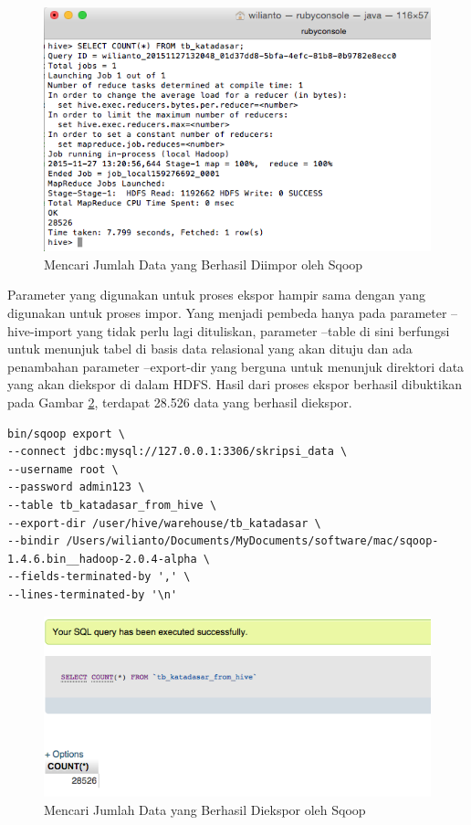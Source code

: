 \begin{figure}
	\centering
	\includegraphics[scale=0.5]{Gambar/cek-hasil-impor-sqoop.png}
	\caption[Mencari Jumlah Data yang Berhasil Diimpor oleh Sqoop]{Mencari Jumlah Data yang Berhasil Diimpor oleh Sqoop}
	\label{fig:cek-hasil-impor-sqoop}
\end{figure}

Parameter yang digunakan untuk proses ekspor hampir sama dengan yang digunakan untuk proses impor. Yang menjadi pembeda hanya pada parameter --hive-import yang tidak perlu lagi dituliskan, parameter --table di sini berfungsi untuk menunjuk tabel di basis data relasional yang akan dituju dan ada penambahan parameter --export-dir yang berguna untuk menunjuk direktori data yang akan diekspor di dalam HDFS. Hasil dari proses ekspor berhasil dibuktikan pada Gambar \ref{fig:cek-hasil-ekspor-sqoop}, terdapat 28.526 data yang berhasil diekspor.

\begin{lstlisting}[basicstyle=\tiny,caption=Perintah Sqoop untuk Melakukan Ekspor]
bin/sqoop export \
--connect jdbc:mysql://127.0.0.1:3306/skripsi_data \
--username root \
--password admin123 \
--table tb_katadasar_from_hive \
--export-dir /user/hive/warehouse/tb_katadasar \
--bindir /Users/wilianto/Documents/MyDocuments/software/mac/sqoop-1.4.6.bin__hadoop-2.0.4-alpha \
--fields-terminated-by ',' \
--lines-terminated-by '\n'
\end{lstlisting}

\begin{figure}
	\centering
	\includegraphics[scale=0.5]{Gambar/cek-hasil-ekspor-sqoop.png}
	\caption[Mencari Jumlah Data yang Berhasil Diekspor oleh Sqoop]{Mencari Jumlah Data yang Berhasil Diekspor oleh Sqoop}
	\label{fig:cek-hasil-ekspor-sqoop}
\end{figure}
